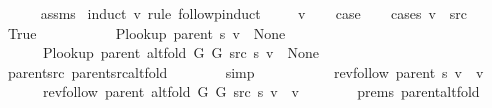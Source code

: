 \begin{isabellebody}
%
\isadelimproof
\ \ \ \ %
\endisadelimproof
%
\isatagproof
{}\isamarkupfalse%
\ assms\isanewline
{}\isamarkupfalse%
\ {\isacharparenleft}{\kern0pt}induct\ v\ rule{\isacharcolon}{\kern0pt}\ follow{\isacharunderscore}{\kern0pt}pinduct{\isacharparenright}{\kern0pt}\isanewline
\ \ \isamarkupfalse%
\ {\isacharparenleft}{\kern0pt}{}\ v{\isacharparenright}{\kern0pt}\isanewline
\ \ \isamarkupfalse%
\ {\isacharquery}{\kern0pt}case\isanewline
\ \ \isamarkupfalse%
\ {\isacharparenleft}{\kern0pt}cases\ {\isachardoublequoteopen}v\ {\isacharequal}{\kern0pt}\ src{\isachardoublequoteclose}{\isacharparenright}{\kern0pt}\isanewline
\ \ \ \ \isamarkupfalse%
\ True\isanewline
\ \ \ \ \isamarkupfalse%
\isanewline
\ \ \ \ \ \ {\isachardoublequoteopen}P{\isacharunderscore}{\kern0pt}lookup\ {\isacharparenleft}{\kern0pt}parent\ s{\isacharparenright}{\kern0pt}\ v\ {\isacharequal}{\kern0pt}\ None{\isachardoublequoteclose}\isanewline
\ \ \ \ \ \ {\isachardoublequoteopen}P{\isacharunderscore}{\kern0pt}lookup\ {\isacharparenleft}{\kern0pt}parent\ {\isacharparenleft}{\kern0pt}alt{\isacharunderscore}{\kern0pt}fold\ G{}\ G{}\ src\ s{\isacharparenright}{\kern0pt}{\isacharparenright}{\kern0pt}\ v\ {\isacharequal}{\kern0pt}\ None{\isachardoublequoteclose}\isanewline
\ \ \ \ \ \ \isamarkupfalse%
\ parent{\isacharunderscore}{\kern0pt}src\ parent{\isacharunderscore}{\kern0pt}src{\isacharunderscore}{\kern0pt}alt{\isacharunderscore}{\kern0pt}fold\isanewline
\ \ \ \ \ \ \isamarkupfalse%
\ simp{\isacharplus}{\kern0pt}\isanewline
\ \ \ \ \isamarkupfalse%
\isanewline
\ \ \ \ \ \ {\isachardoublequoteopen}rev{\isacharunderscore}{\kern0pt}follow\ {\isacharparenleft}{\kern0pt}parent\ s{\isacharparenright}{\kern0pt}\ v\ {\isacharequal}{\kern0pt}\ {\isacharbrackleft}{\kern0pt}v{\isacharbrackright}{\kern0pt}{\isachardoublequoteclose}\isanewline
\ \ \ \ \ \ {\isachardoublequoteopen}rev{\isacharunderscore}{\kern0pt}follow\ {\isacharparenleft}{\kern0pt}parent\ {\isacharparenleft}{\kern0pt}alt{\isacharunderscore}{\kern0pt}fold\ G{}\ G{}\ src\ s{\isacharparenright}{\kern0pt}{\isacharparenright}{\kern0pt}\ v\ {\isacharequal}{\kern0pt}\ {\isacharbrackleft}{\kern0pt}v{\isacharbrackright}{\kern0pt}{\isachardoublequoteclose}\isanewline
\ \ \ \ \ \ \isamarkupfalse%
\ {\isachardoublequoteopen}{}{\isachardot}{\kern0pt}prems{\isachardoublequoteclose}{\isacharparenleft}{\kern0pt}{}{\isacharparenright}{\kern0pt}\ parent{\isacharunderscore}{\kern0pt}alt{\isacharunderscore}{\kern0pt}fold\isanewline

\end{isabellebody}
